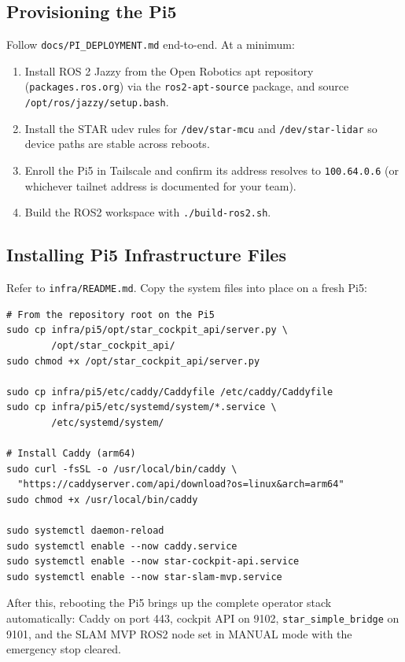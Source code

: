 \documentclass[11pt,letterpaper]{article}
\begin{document}
\subsection{Provisioning the Pi5}
Follow \texttt{docs/PI\_DEPLOYMENT.md} end-to-end. At a minimum:
\begin{enumerate}[leftmargin=1.4em,itemsep=2pt]
\item Install ROS 2 Jazzy from the Open Robotics apt repository
      (\texttt{packages.ros.org}) via the \texttt{ros2-apt-source}
      package, and source
      \texttt{/opt/ros/jazzy/setup.bash}.
\item Install the STAR udev rules for \texttt{/dev/star-mcu} and
      \texttt{/dev/star-lidar} so device paths are stable across
      reboots.
\item Enroll the Pi5 in Tailscale and confirm its address resolves
      to \texttt{100.64.0.6} (or whichever tailnet address is
      documented for your team).
\item Build the ROS2 workspace with \texttt{./build-ros2.sh}.
\end{enumerate}

\subsection{Installing Pi5 Infrastructure Files}
Refer to \texttt{infra/README.md}. Copy the system files into place on
a fresh Pi5:
\begin{lstlisting}[style=shellcmd]
# From the repository root on the Pi5
sudo cp infra/pi5/opt/star_cockpit_api/server.py \
        /opt/star_cockpit_api/
sudo chmod +x /opt/star_cockpit_api/server.py

sudo cp infra/pi5/etc/caddy/Caddyfile /etc/caddy/Caddyfile
sudo cp infra/pi5/etc/systemd/system/*.service \
        /etc/systemd/system/

# Install Caddy (arm64)
sudo curl -fsSL -o /usr/local/bin/caddy \
  "https://caddyserver.com/api/download?os=linux&arch=arm64"
sudo chmod +x /usr/local/bin/caddy

sudo systemctl daemon-reload
sudo systemctl enable --now caddy.service
sudo systemctl enable --now star-cockpit-api.service
sudo systemctl enable --now star-slam-mvp.service
\end{lstlisting}

After this, rebooting the Pi5 brings up the complete operator stack
automatically: Caddy on port 443, cockpit API on 9102,
\texttt{star\_simple\_bridge} on 9101, and the SLAM MVP ROS2 node
set in MANUAL mode with the emergency stop cleared.
\end{document}
